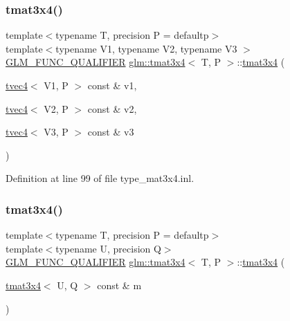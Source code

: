 \subsubsection{\texorpdfstring{tmat3x4()}{tmat3x4()}\hspace{0.1cm}{\footnotesize\ttfamily [21/22]}}
{\footnotesize\ttfamily template$<$typename T, precision P = defaultp$>$ \\
template$<$typename V1, typename V2, typename V3 $>$ \\
\mbox{\hyperlink{setup_8hpp_a33fdea6f91c5f834105f7415e2a64407}{G\+L\+M\+\_\+\+F\+U\+N\+C\+\_\+\+Q\+U\+A\+L\+I\+F\+I\+ER}} \mbox{\hyperlink{structglm_1_1tmat3x4}{glm\+::tmat3x4}}$<$ T, P $>$\+::\mbox{\hyperlink{structglm_1_1tmat3x4}{tmat3x4}} (\begin{DoxyParamCaption}\item[{\mbox{\hyperlink{structglm_1_1tvec4}{tvec4}}$<$ V1, P $>$ const \&}]{v1,  }\item[{\mbox{\hyperlink{structglm_1_1tvec4}{tvec4}}$<$ V2, P $>$ const \&}]{v2,  }\item[{\mbox{\hyperlink{structglm_1_1tvec4}{tvec4}}$<$ V3, P $>$ const \&}]{v3 }\end{DoxyParamCaption})}



Definition at line 99 of file type\+\_\+mat3x4.\+inl.

\mbox{\label{structglm_1_1tmat3x4_a1117842438c01204536f3829257eaa12}} 
\subsubsection{\texorpdfstring{tmat3x4()}{tmat3x4()}\hspace{0.1cm}{\footnotesize\ttfamily [22/22]}}
{\footnotesize\ttfamily template$<$typename T, precision P = defaultp$>$ \\
template$<$typename U, precision Q$>$ \\
\mbox{\hyperlink{setup_8hpp_a33fdea6f91c5f834105f7415e2a64407}{G\+L\+M\+\_\+\+F\+U\+N\+C\+\_\+\+Q\+U\+A\+L\+I\+F\+I\+ER}} \mbox{\hyperlink{structglm_1_1tmat3x4}{glm\+::tmat3x4}}$<$ T, P $>$\+::\mbox{\hyperlink{structglm_1_1tmat3x4}{tmat3x4}} (\begin{DoxyParamCaption}\item[{\mbox{\hyperlink{structglm_1_1tmat3x4}{tmat3x4}}$<$ U, Q $>$ const \&}]{m }\end{DoxyParamCaption})}



